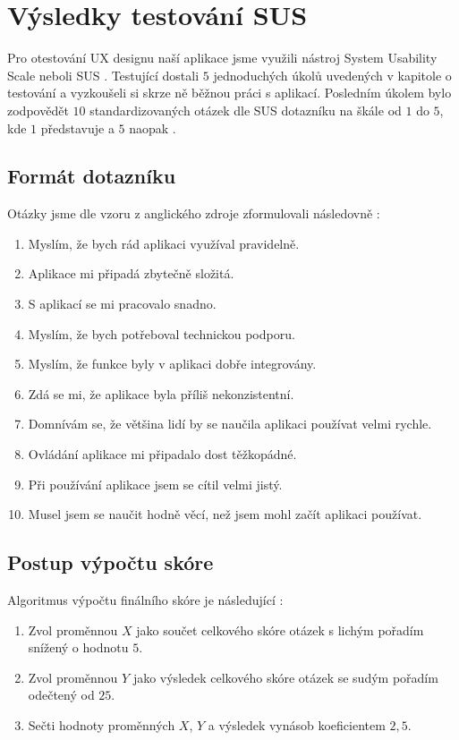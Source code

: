 \documentclass[12pt,a4paper]{report}
\begin{document}
\section{Výsledky testování SUS}

Pro otestování UX designu naší aplikace jsme využili nástroj System Usability Scale neboli SUS \citep{sus-test}. Testující dostali $5$ jednoduchých úkolů uvedených v kapitole o testování a vyzkoušeli si skrze ně běžnou práci s aplikací. Posledním úkolem bylo zodpovědět $10$ standardizovaných otázek dle SUS dotazníku na škále od $1$ do $5$, kde $1$ představuje  a $5$ naopak . 

\subsection{Formát dotazníku}
Otázky jsme dle vzoru z anglického zdroje zformulovali následovně \citep{sus-adobe}:

\begin{enumerate}
    \item Myslím, že bych rád aplikaci využíval pravidelně.
    \item Aplikace mi připadá zbytečně složitá.
    \item S aplikací se mi pracovalo snadno.
    \item Myslím, že bych potřeboval technickou podporu.
    \item Myslím, že funkce byly v aplikaci dobře integrovány.
    \item Zdá se mi, že aplikace byla příliš nekonzistentní.
    \item Domnívám se, že většina lidí by se naučila aplikaci používat velmi rychle.
    \item Ovládání aplikace mi připadalo dost těžkopádné.
    \item Při používání aplikace jsem se cítil velmi jistý.
    \item Musel jsem se naučit hodně věcí, než jsem mohl začít aplikaci používat.
\end{enumerate}

\subsection{Postup výpočtu skóre}

Algoritmus výpočtu finálního skóre je následující \citep{sus-adobe}:

\begin{enumerate}
    \item Zvol proměnnou $X$ jako součet celkového skóre otázek s lichým pořadím snížený o hodnotu $5$.
    \item Zvol proměnnou $Y$ jako výsledek celkového skóre otázek se sudým pořadím odečtený od $25$.
    \item Sečti hodnoty proměnných $X$, $Y$ a výsledek vynásob koeficientem $2,5$.
\end{enumerate}
\end{document}
